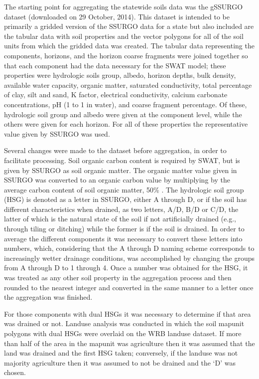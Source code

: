 The starting point for aggregating the statewide soils data was the gSSURGO dataset (downloaded on 29 October, 2014). This dataset is intended to be primarily a gridded version of the SSURGO data for a state but also included are the tabular data with soil properties and the vector polygons for all of the soil units from which the gridded data was created. The tabular data representing the components, horizons, and the horizon coarse fragments were joined together so that each component had the data necessary for the SWAT model; these properties were hydrologic soils group, albedo, horizon depths, bulk density, available water capacity, organic matter, saturated conductivity, total percentage of clay, silt and sand, K factor, electrical conductivity, calcium carbonate concentrations, pH (1 to 1 in water), and coarse fragment percentage. Of these, hydrologic soil group and albedo were given at the component level, while the others were given for each horizon.  For all of these properties the representative value given by SSURGO was used. 

Several changes were made to the dataset before aggregation, in order to facilitate processing. Soil organic carbon content is required by SWAT, but is given by SSURGO as soil organic matter. The organic matter value given in SSURGO was converted to an organic carbon value by multiplying by the average carbon content of soil organic matter, 50\% \citep{brady_elements_2004}. The hydrologic soil group (HSG) is denoted as a letter in SSURGO, either A through D, or if the soil has different characteristics when drained, as two letters, A/D, B/D or C/D, the latter of which is the natural state of the soil if not artificially drained (e.g., through tiling or ditching) while the former is if the soil is drained. In order to average the different components it was necessary to convert these letters into numbers, which, considering that the A through D naming scheme corresponds to increasingly wetter drainage conditions, was accomplished by changing the groups from A through D to 1 through 4. Once a number was obtained for the HSG, it was treated as any other soil property in the aggregation process and then rounded to the nearest integer and converted in the same manner to a letter once the aggregation was finished. 

For those components with dual HSGs it was necessary to determine if that area was drained or not. Landuse analysis was conducted in which the soil mapunit polygons with dual HSGs were overlaid on the WRB landuse dataset. If more than half of the area in the mapunit was agriculture then it was assumed that the land was drained and the first HSG taken; conversely, if the landuse was not majority agriculture then it was assumed to not be drained and the `D' was chosen.

